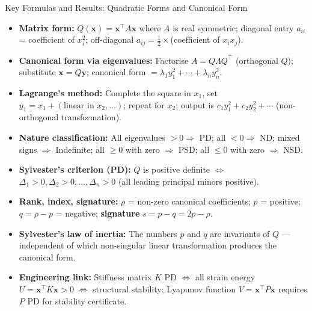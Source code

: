 \documentclass[12pt,a4paper]{article}
\begin{document}
\begin{learnbox}{Key Formulas and Results: Quadratic Forms and Canonical Form}
\begin{itemize}[leftmargin=1.5em]
  \item \textbf{Matrix form:} $Q(\mathbf{x}) = \mathbf{x}^{\top}A\mathbf{x}$ where $A$ is real symmetric; diagonal entry $a_{ii}$ = coefficient of $x_i^{2}$; off-diagonal $a_{ij} = \frac{1}{2}\times$(coefficient of $x_ix_j$).

  \item \textbf{Canonical form via eigenvalues:} Factorise $A = Q\Lambda Q^{\top}$ (orthogonal $Q$); substitute $\mathbf{x} = Q\mathbf{y}$; canonical form $= \lambda_1 y_1^{2}+\cdots+\lambda_n y_n^{2}$.

  \item \textbf{Lagrange's method:} Complete the square in $x_1$, set $y_1 = x_1 + (\text{linear in }x_2,\ldots)$; repeat for $x_2$; output is $c_1y_1^{2}+c_2y_2^{2}+\cdots$ (non-orthogonal transformation).

  \item \textbf{Nature classification:} All eigenvalues $>0 \Rightarrow$ PD; all $<0 \Rightarrow$ ND; mixed signs $\Rightarrow$ Indefinite; all $\geq0$ with zero $\Rightarrow$ PSD; all $\leq0$ with zero $\Rightarrow$ NSD.

  \item \textbf{Sylvester's criterion (PD):} $Q$ is positive definite $\iff$ $\Delta_1>0, \Delta_2>0, \ldots, \Delta_n>0$ (all leading principal minors positive).

  \item \textbf{Rank, index, signature:} $\rho$ = non-zero canonical coefficients; $p$ = positive; $q = \rho - p$ = negative; \textbf{signature} $s = p - q = 2p - \rho$.

  \item \textbf{Sylvester's law of inertia:} The numbers $p$ and $q$ are invariants of $Q$ --- independent of which non-singular linear transformation produces the canonical form.

  \item \textbf{Engineering link:} Stiffness matrix $K$ PD $\Leftrightarrow$ all strain energy $U = \mathbf{x}^{\top}K\mathbf{x} > 0$ $\Leftrightarrow$ structural stability; Lyapunov function $V = \mathbf{x}^{\top}P\mathbf{x}$ requires $P$ PD for stability certificate.
\end{itemize}
\end{learnbox}
\end{document}
